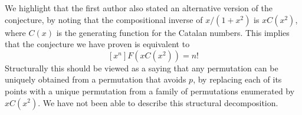 \documentclass[a4paper]{article}
\begin{document}
We highlight that the first author also stated an alternative version of the conjecture,
by noting that the compositional inverse of $x/(1+x^2)$ is $xC(x^2)$, where $C(x)$ is the
generating function for the Catalan numbers. This implies that the conjecture we have
proven is equivalent to
\[[x^n]F(xC(x^2))=n!
\]
Structurally this should be viewed as a
saying that any permutation can be uniquely obtained from a permutation that avoids $p$, by
replacing each of its points with a unique permutation from a family of permutations
enumerated by $xC(x^2)$. We have not been able to describe this structural decomposition.



\end{document}
